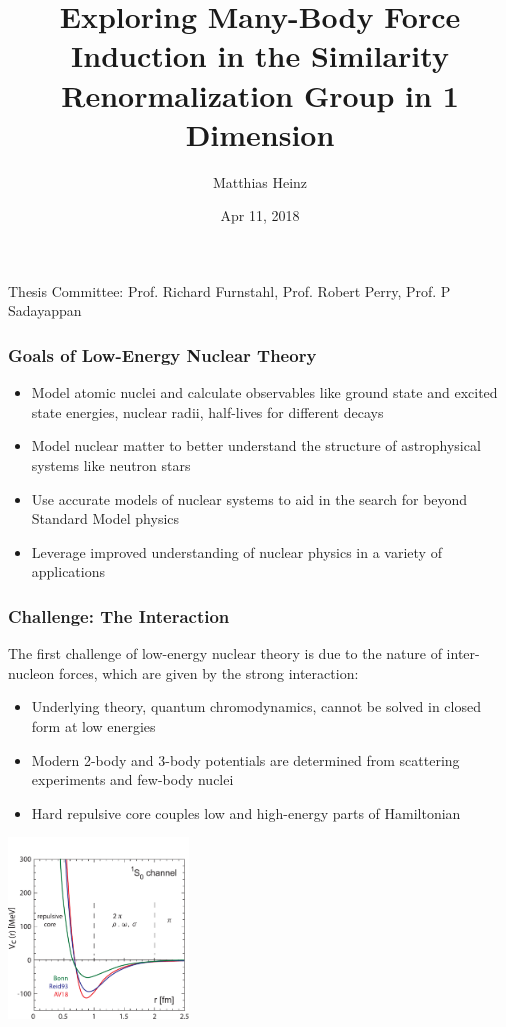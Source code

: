 \documentclass{beamer}
\title[SRG Exploration in 1-D]{Exploring Many-Body Force Induction in the Similarity Renormalization Group in 1 Dimension}
\author{Matthias Heinz}
\institute{The Ohio State University}
\date{Apr 11, 2018}
\begin{document}
{%
\begin{frame}
    \titlepage
    \begin{center}
        \scriptsize{Thesis Committee: Prof. Richard Furnstahl, Prof. Robert Perry, Prof. P Sadayappan}
    \end{center}
\end{frame}

\begin{frame}
\frametitle{Goals of Low-Energy Nuclear Theory}
\begin{itemize}
    \item Model atomic nuclei and calculate observables like ground state and excited state energies, nuclear radii, half-lives for different decays
    \item Model nuclear matter to better understand the structure of astrophysical systems like neutron stars
    \item Use accurate models of nuclear systems to aid in the search for beyond Standard Model physics
    \item Leverage improved understanding of nuclear physics in a variety of applications
\end{itemize}
\end{frame}


\begin{frame}
\frametitle{Challenge: The Interaction}
The first challenge of low-energy nuclear theory is due to the nature of inter-nucleon forces, which are given by the strong interaction:
\begin{itemize}
    \item Underlying theory, quantum chromodynamics, cannot be solved in closed form at low energies
    \item Modern 2-body and 3-body potentials are determined from scattering experiments and few-body nuclei
    \item Hard repulsive core couples low and high-energy parts of Hamiltonian
\end{itemize}
\begin{center}
\includegraphics[width=0.36\textwidth]{hatsuda_phen-pot_new}


\end{center}
\end{frame}}
\end{document}
